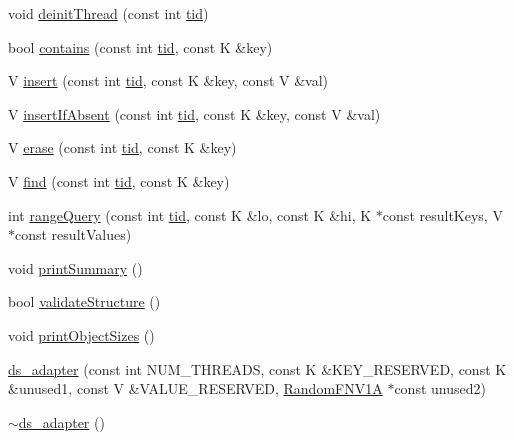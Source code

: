 \begin{DoxyCompactItemize}
\item 
void \hyperlink{classds__adapter_a173ca48b19fc1dc346159ea582c690cd}{deinit\+Thread} (const int \hyperlink{microbench_2main_8cpp_a9ca9869868fe7e7a38a921cc7de4103f}{tid})
\item 
bool \hyperlink{classds__adapter_aecf1899dbe9fae93c72ee2b5549cf6eb}{contains} (const int \hyperlink{microbench_2main_8cpp_a9ca9869868fe7e7a38a921cc7de4103f}{tid}, const K \&key)
\item 
V \hyperlink{classds__adapter_a6c0fc676d77e30e14946baf325174739}{insert} (const int \hyperlink{microbench_2main_8cpp_a9ca9869868fe7e7a38a921cc7de4103f}{tid}, const K \&key, const V \&val)
\item 
V \hyperlink{classds__adapter_ae9cb29ad0c0338c0e1d12ef97e008135}{insert\+If\+Absent} (const int \hyperlink{microbench_2main_8cpp_a9ca9869868fe7e7a38a921cc7de4103f}{tid}, const K \&key, const V \&val)
\item 
V \hyperlink{classds__adapter_a1bf459e8449df93cc738a644aeffdcfb}{erase} (const int \hyperlink{microbench_2main_8cpp_a9ca9869868fe7e7a38a921cc7de4103f}{tid}, const K \&key)
\item 
V \hyperlink{classds__adapter_a0109b0d011810f687c9e9273eb1d1bc8}{find} (const int \hyperlink{microbench_2main_8cpp_a9ca9869868fe7e7a38a921cc7de4103f}{tid}, const K \&key)
\item 
int \hyperlink{classds__adapter_a23a9c8db5425e98a93d647df1c6c23dd}{range\+Query} (const int \hyperlink{microbench_2main_8cpp_a9ca9869868fe7e7a38a921cc7de4103f}{tid}, const K \&lo, const K \&hi, K $\ast$const result\+Keys, V $\ast$const result\+Values)
\item 
void \hyperlink{classds__adapter_aac97293215557665d2ef1e1a0d06fcfd}{print\+Summary} ()
\item 
bool \hyperlink{classds__adapter_ae50fe8a8683c0278cdd4c45e1405860d}{validate\+Structure} ()
\item 
void \hyperlink{classds__adapter_a33b13b7059a8c0345fb59a324dc3a691}{print\+Object\+Sizes} ()
\item 
\hyperlink{classds__adapter_a8bd2274b39a6716d649cde5a8f313b40}{ds\+\_\+adapter} (const int N\+U\+M\+\_\+\+T\+H\+R\+E\+A\+DS, const K \&K\+E\+Y\+\_\+\+R\+E\+S\+E\+R\+V\+ED, const K \&unused1, const V \&V\+A\+L\+U\+E\+\_\+\+R\+E\+S\+E\+R\+V\+ED, \hyperlink{classRandomFNV1A}{Random\+F\+N\+V1A} $\ast$const unused2)
\item 
\hyperlink{classds__adapter_a366f46dd39d59f2d4a147589f5fd98e3}{$\sim$ds\+\_\+adapter} ()
\item 

\end{DoxyCompactItemize}
